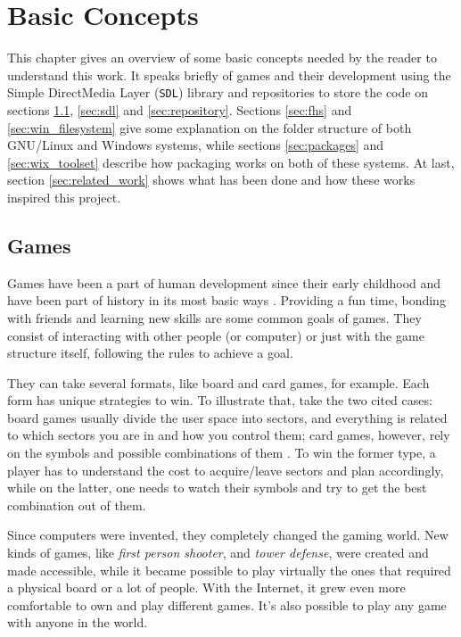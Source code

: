 \chapter{Basic Concepts}
\label {sec:basic_concepts}

This chapter gives an overview of some basic concepts needed by the reader to understand this work. It speaks briefly of games and their development using the Simple DirectMedia Layer (\texttt{SDL}) library and repositories to store the code on sections \ref{sec:games}, \ref{sec:sdl} and \ref{sec:repository}. Sections \ref{sec:fhs} and \ref{sec:win_filesystem} give some explanation on the folder structure of both GNU/Linux and Windows systems, while sections \ref{sec:packages} and \ref{sec:wix_toolset} describe how packaging works on both of these systems. At last, section \ref{sec:related_work} shows what has been done and how these works inspired this project.

\section{Games}
\label {sec:games}

Games have been a part of human development since their early childhood and have been part of history in its most basic ways \cite{bethke2003game}. Providing a fun time, bonding with friends and learning new skills are some common goals of games. They consist of interacting with other people (or computer) or just with the game structure itself, following the rules to achieve a goal.

They can take several formats, like board and card games, for example. Each form has unique strategies to win. To illustrate that, take the two cited cases: board games usually divide the user space into sectors, and everything is related to which sectors you are in and how you control them; card games, however, rely on the symbols and possible combinations of them \cite{crawford1984art}. To win the former type, a player has to understand the cost to acquire/leave sectors and plan accordingly, while on the latter, one needs to watch their symbols and try to get the best combination out of them.

Since computers were invented, they completely changed the gaming world. New kinds of games, like \textit{first person shooter}, and \textit{tower defense}, were created and made accessible, while it became possible to play virtually the ones that required a physical board or a lot of people. With the Internet, it grew even more comfortable to own and play different games. It's also possible to play any game with anyone in the world.

